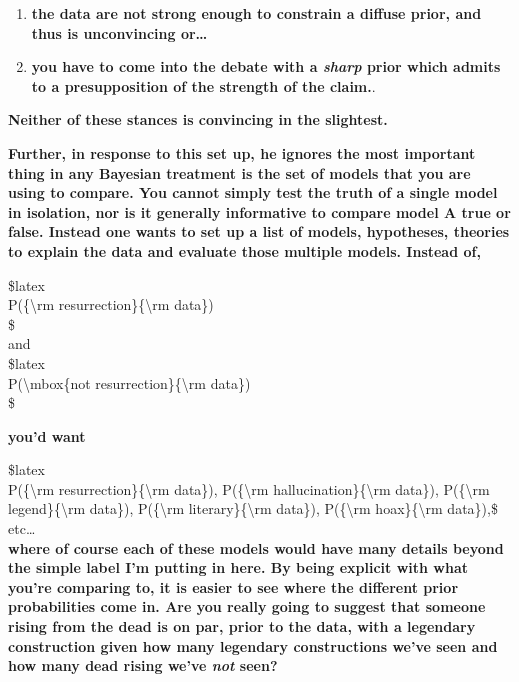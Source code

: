 \begin{enumerate}
\def\labelenumi{\arabic{enumi}.}
\itemsep1pt\parskip0pt
\item
  \textbf{the data are not strong enough to constrain a diffuse prior,
  and thus is unconvincing or\ldots{}}
\item
  \textbf{you have to come into the debate with a \emph{sharp} prior
  which admits to a presupposition of the strength of the claim.}.
\end{enumerate}

\textbf{Neither of these stances is convincing in the slightest.}

\textbf{Further, in response to this set up, he ignores the most
important thing in any Bayesian treatment is the set of models that you
are using to compare. You cannot simply test the truth of a single model
in isolation, nor is it generally informative to compare model A true or
false. Instead one wants to set up a list of models, hypotheses,
theories to explain the data and evaluate those multiple models. Instead
of,}

\$latex\\P(\{\textbackslash{}rm
resurrection\}\textbar{}\{\textbackslash{}rm
data\})\\\$\\and\\\$latex\\P(\textbackslash{}mbox\{not
resurrection\}\textbar{}\{\textbackslash{}rm data\})\\\$

\textbf{you'd want}

\$latex\\P(\{\textbackslash{}rm
resurrection\}\textbar{}\{\textbackslash{}rm data\}),
P(\{\textbackslash{}rm hallucination\}\textbar{}\{\textbackslash{}rm
data\}), P(\{\textbackslash{}rm legend\}\textbar{}\{\textbackslash{}rm
data\}), P(\{\textbackslash{}rm literary\}\textbar{}\{\textbackslash{}rm
data\}), P(\{\textbackslash{}rm hoax\}\textbar{}\{\textbackslash{}rm
data\}),\$ etc\ldots{}\\\textbf{where of course each of these models
would have many details beyond the simple label I'm putting in here. By
being explicit with what you're comparing to, it is easier to see where
the different prior probabilities come in. Are you really going to
suggest that someone rising from the dead is on par, prior to the data,
with a legendary construction given how many legendary constructions
we've seen and how many dead rising we've \emph{not} seen?}

